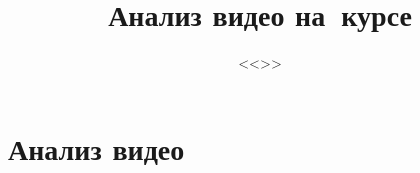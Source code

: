 \documentclass[12pt]{report}
\title{Анализ видео на~курсе}
\subtitle{<<\coursetitle>>}
\begin{document}
\maketitle
\tableofcontents



\chapter{Анализ видео}


\end{document}
